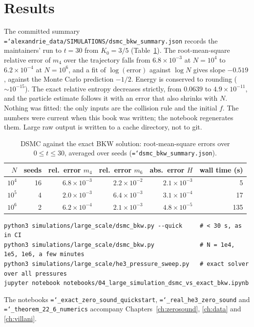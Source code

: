 \documentclass[11pt,a4paper,openany]{book}
\newcommand{\code}[1]{\texttt{\hyphenchar\font=`\-\relax #1}}
\theoremstyle{definition}
\theoremstyle{plain}
\begin{document}
\section{Results}

The committed summary \code{alexandrie\_data/SIMULATIONS/dsmc\_bkw\_summary.json} records the
maintainers' run to $t=30$ from $K_0=3/5$ (Table~\ref{tab:dsmc}). The root-mean-square relative
error of $m_4$ over the trajectory falls from $6.8\times10^{-3}$ at $N=10^4$ to $6.2\times10^{-4}$
at $N=10^6$, and a fit of $\log(\text{error})$ against $\log N$ gives slope $-0.519$, against the
Monte Carlo prediction $-1/2$. Energy is conserved to rounding ($\sim10^{-15}$). The exact relative
entropy decreases strictly, from $0.0639$ to $4.9\times10^{-11}$, and the particle estimate
follows it with an error that also shrinks with $N$. Nothing was fitted: the only inputs are the
collision rule and the initial $f$. The numbers were current when this book was written; the
notebook regenerates them. Large raw output is written to a cache directory, not to git.

\begin{table}[htbp]
\centering
\caption{DSMC against the exact BKW solution: root-mean-square errors over $0\le t\le30$, averaged
over seeds (\code{dsmc\_bkw\_summary.json}).}
\label{tab:dsmc}
\begin{tabular}{rrrrrr}
\toprule
$N$ & seeds & rel.\ error $m_4$ & rel.\ error $m_6$ & abs.\ error $H$ & wall time (s) \\
\midrule
$10^4$ & 16 & $6.8\times10^{-3}$ & $2.2\times10^{-2}$ & $2.1\times10^{-3}$ & 5 \\
$10^5$ & 4  & $2.0\times10^{-3}$ & $6.4\times10^{-3}$ & $3.1\times10^{-4}$ & 17 \\
$10^6$ & 2  & $6.2\times10^{-4}$ & $2.1\times10^{-3}$ & $4.8\times10^{-5}$ & 135 \\
\bottomrule
\end{tabular}
\end{table}

\begin{runit}
\begin{verbatim}
python3 simulations/large_scale/dsmc_bkw.py --quick     # < 30 s, as in CI
python3 simulations/large_scale/dsmc_bkw.py             # N = 1e4, 1e5, 1e6, a few minutes
python3 simulations/large_scale/he3_pressure_sweep.py   # exact solver over all pressures
jupyter notebook notebooks/04_large_simulation_dsmc_vs_exact_bkw.ipynb
\end{verbatim}
The notebooks \code{01\_exact\_zero\_sound\_quickstart}, \code{02\_real\_he3\_zero\_sound} and
\code{03\_theorem\_22\_6\_numerics} accompany Chapters~\ref{ch:zerosound}, \ref{ch:data} and
\ref{ch:villani}.
\end{runit}
\end{document}
